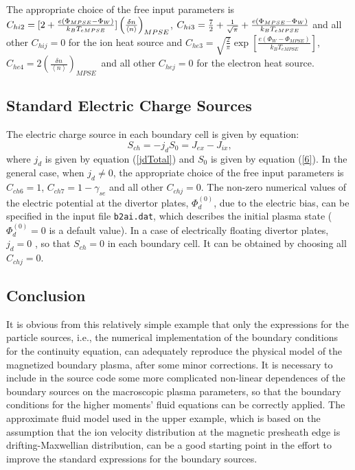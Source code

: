 \documentclass[11pt]{article}
\begin{document}
\bigskip

The appropriate choice of the free input parameters is $C_{hi2}=[2+\frac{%
e\left( \Phi_{MPSE}-\Phi_{W}\right) }{k_{B}T_{eMPSE}}]\left( \frac{\delta n}{%
\left\langle n\right\rangle }\right) _{MPSE}$, $C_{hi3}=\frac{7}{2}+\frac{1}{%
\sqrt{\pi}}+\frac{e\left( \Phi_{MPSE}-\Phi _{W}\right) }{k_{B}T_{eMPSE}}$
and all other $C_{hij}=0$ for the ion heat source and $C_{he3}=\sqrt{\frac{2%
}{\pi}}\exp\left[ \frac{e\left( \Phi _{W}-\Phi_{MPSE}\right) }{k_{B}T_{eMPSE}%
}\right] $, $C_{he4}=2\left( \frac{\delta n}{\left\langle n\right\rangle }%
\right) _{MPSE}$\ and all other $C_{hej}=0$ for the electron heat source.

\bigskip

\subsection{Standard Electric Charge Sources}

\bigskip

The electric charge source in each boundary cell is given by equation:
\begin{equation}
S_{ch}=-j_{d}S_{0}=J_{ex}-J_{ix}\text{,}   \label{chargeS}
\end{equation}
where $j_{d}$ is given by equation (\ref{jdTotal}) and $S_{0}$ is given by
equation (\ref{6}). In the general case, when $j_{d}\neq0$, the appropriate
choice of the free input parameters is $C_{ch6}=1$, $C_{ch7}=1-\gamma_{se}$
and all other $C_{chj}=0$. The non-zero numerical values of the electric
potential at the divertor plates, $\Phi_{d}^{\left( 0\right) }$, due to the
electric bias, can be specified in the input file \texttt{b2ai.dat}, which
describes the initial plasma state ($\Phi_{d}^{\left( 0\right) }=0$ is a
default value). In a case of electrically floating divertor plates, $j_{d}=0$%
, so that $S_{ch}=0$ in each boundary cell. It can be obtained by choosing
all $C_{chj}=0$.

\bigskip

\subsection{Conclusion}

\bigskip

It is obvious from this relatively simple example that only the expressions
for the particle sources, i.e., the numerical implementation of the boundary
conditions for the continuity equation, can adequately reproduce the
physical model of the magnetized boundary plasma, after some minor
corrections. It is necessary to include in the source code some more
complicated non-linear dependences of the boundary sources on the
macroscopic plasma parameters, so that the boundary conditions for the
higher moments' fluid equations can be correctly applied. The approximate
fluid model used in the upper example, which is based on the assumption that
the ion velocity distribution at the magnetic presheath edge is
drifting-Maxwellian distribution, can be a good starting point in the effort
to improve the standard expressions for the boundary sources.
\end{document}
